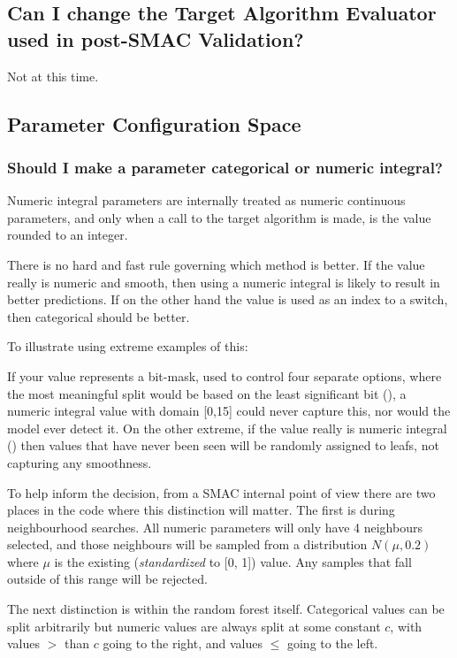 \documentclass[11pt,letterpaper,oneside]{article}
\begin{document}
\subsection{Can I change the Target Algorithm Evaluator used in post-SMAC Validation?}

Not at this time.

\subsection{Parameter Configuration Space}

\subsubsection{Should I make a parameter categorical or numeric integral?}

	Numeric integral parameters are internally treated as numeric continuous parameters, and only when a call to the target algorithm is made, is the value rounded to an integer. 
	
	There is no hard and fast rule governing which method is better. If the value really is numeric and smooth, then using a numeric integral is likely to result in better predictions. If on the other hand the value is used as an index to a switch, then categorical should be better.
	
	To illustrate using extreme examples of this:
	
	If your value represents a bit-mask, used to control four separate options, where the most meaningful split would be based on the least significant bit (), a numeric integral value with domain [0,15] could never capture this, nor would the model ever detect it. On the other extreme, if the value really is numeric integral (\eg{[0, 1024]}) then values that have never been seen will be randomly assigned to leafs, not capturing any smoothness.
		
	
	To help inform the decision, from a SMAC internal point of view there are two places in the code where this distinction will matter. The first is during neighbourhood searches. All numeric parameters will only have 4 neighbours selected, and those neighbours will be sampled from a distribution $N(\mu, 0.2)$ where $\mu$ is the existing (\emph{standardized} to [0, 1]) value. Any samples that fall outside of this range will be rejected.
	
	The next distinction is within the random forest itself. Categorical values can be split arbitrarily but numeric values are always split at some constant $c$, with values $>$ than $c$ going to the right, and values $\leq$ going to the left.
\end{document}

